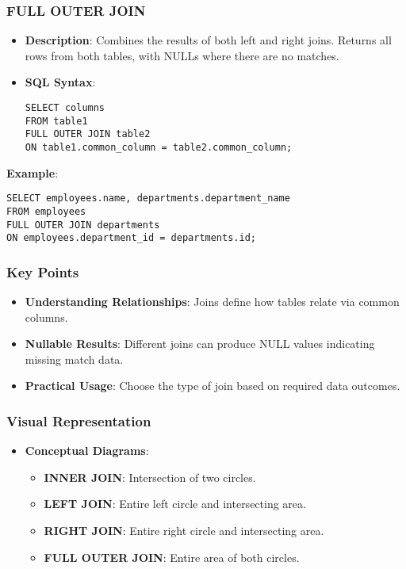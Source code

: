 \documentclass[aspectratio=169]{beamer}
\begin{document}
\begin{frame}[fragile]
    \frametitle{FULL OUTER JOIN}
    \begin{itemize}
        \item \textbf{Description}: Combines the results of both left and right joins. Returns all rows from both tables, with NULLs where there are no matches.
        \item \textbf{SQL Syntax}:
        \begin{lstlisting}
SELECT columns
FROM table1
FULL OUTER JOIN table2
ON table1.common_column = table2.common_column;
        \end{lstlisting}
    \end{itemize}
    \textbf{Example}:
    \begin{lstlisting}
SELECT employees.name, departments.department_name
FROM employees
FULL OUTER JOIN departments
ON employees.department_id = departments.id;
    \end{lstlisting}
\end{frame}

\begin{frame}[fragile]
    \frametitle{Key Points}
    \begin{itemize}
        \item \textbf{Understanding Relationships}: Joins define how tables relate via common columns.
        \item \textbf{Nullable Results}: Different joins can produce NULL values indicating missing match data.
        \item \textbf{Practical Usage}: Choose the type of join based on required data outcomes.
    \end{itemize}
\end{frame}

\begin{frame}[fragile]
    \frametitle{Visual Representation}
    \begin{itemize}
        \item \textbf{Conceptual Diagrams}:
        \begin{itemize}
            \item \textbf{INNER JOIN}: Intersection of two circles.
            \item \textbf{LEFT JOIN}: Entire left circle and intersecting area.
            \item \textbf{RIGHT JOIN}: Entire right circle and intersecting area.
            \item \textbf{FULL OUTER JOIN}: Entire area of both circles.
        \end{itemize}
    \end{itemize}
\end{frame}
\end{document}
